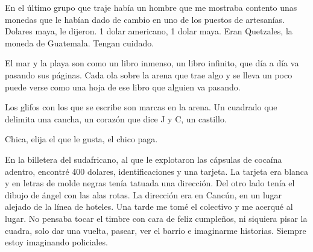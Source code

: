 \documentclass[11pt,twoside,openright,a6paper]{book}
\begin{document}
\vspace{0.5cm}
\hrulefill\hspace{0.2cm} \decofourleft\decofourright \hspace{0.2cm} \hrulefill
\vspace{0.5cm}

En el último grupo que traje había un hombre que me mostraba contento
unas monedas que le habían dado de cambio en uno de los puestos de
artesanías. Dolares maya, le dijeron. 1 dolar americano, 1 dolar maya. Eran
Quetzales, la moneda de Guatemala. Tengan cuidado.


\vspace{0.5cm}
\hrulefill\hspace{0.2cm} \decofourleft\decofourright \hspace{0.2cm} \hrulefill
\vspace{0.5cm}

El mar y la playa son como un libro inmenso, un libro infinito, que día
a día va pasando sus páginas. Cada ola sobre la arena que trae algo y se
lleva un poco puede verse como una hoja de ese libro que alguien va pasando.

Los glifos con los que se escribe son marcas en la arena. Un cuadrado que
delimita una cancha, un corazón que dice J y C, un castillo.


\vspace{0.5cm}
\hrulefill\hspace{0.2cm} \decofourleft\decofourright \hspace{0.2cm} \hrulefill
\vspace{0.5cm}

Chica, elija el que le gusta, el chico paga.


\vspace{0.5cm}
\hrulefill\hspace{0.2cm} \decofourleft\decofourright \hspace{0.2cm} \hrulefill
\vspace{0.5cm}

En la billetera del sudafricano, al que le explotaron las cápsulas
de cocaína adentro, encontré 400 dolares, identificaciones y una
tarjeta. La tarjeta era blanca y en letras de molde negras tenía tatuada
una dirección. Del otro lado tenía el dibujo de ángel con las alas
rotas. La dirección era en Cancún, en un lugar alejado de la línea de
hoteles. Una tarde me tomé el colectivo y me acerqué al lugar. No pensaba
tocar el timbre con cara de feliz cumpleños, ni siquiera pisar la cuadra,
solo dar una vuelta, pasear, ver el barrio e imaginarme historias. Siempre
estoy imaginando policiales.
\end{document}
